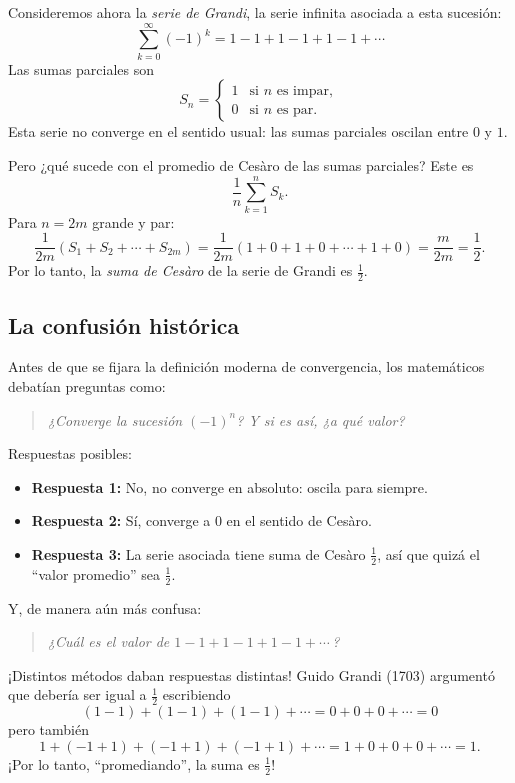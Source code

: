 Consideremos ahora la \emph{serie de Grandi}, la serie infinita asociada a esta sucesión:
\[
  \sum_{k=0}^{\infty} (-1)^k = 1 - 1 + 1 - 1 + 1 - 1 + \cdots
\]
Las sumas parciales son
\[
  S_n =
  \begin{cases}
    1 & \text{si } n \text{ es impar},\\
    0 & \text{si } n \text{ es par}.
  \end{cases}
\]
Esta serie no converge en el sentido usual: las sumas parciales oscilan entre $0$ y $1$.

Pero ¿qué sucede con el promedio de Cesàro de las sumas parciales? Este es
\[
  \frac1n \sum_{k=1}^{n} S_k .
\]
Para $n = 2m$ grande y par:
\[
  \frac{1}{2m}(S_1 + S_2 + \cdots + S_{2m}) = \frac{1}{2m}(1 + 0 + 1 + 0 + \cdots + 1 + 0) = \frac{m}{2m} = \frac12 .
\]
Por lo tanto, la \emph{suma de Cesàro} de la serie de Grandi es $\frac12$.

\subsection{La confusión histórica}

Antes de que se fijara la definición moderna de convergencia, los matemáticos debatían preguntas como:

\begin{quote}
\emph{¿Converge la sucesión $(-1)^n$? Y si es así, ¿a qué valor?}
\end{quote}

Respuestas posibles:
\begin{itemize}
  \item \textbf{Respuesta 1:} No, no converge en absoluto: oscila para siempre.
  \item \textbf{Respuesta 2:} Sí, converge a $0$ en el sentido de Cesàro.
  \item \textbf{Respuesta 3:} La serie asociada tiene suma de Cesàro $\frac12$, así que quizá el ``valor promedio'' sea $\frac12$.
\end{itemize}

Y, de manera aún más confusa:

\begin{quote}
\emph{¿Cuál es el valor de $1 - 1 + 1 - 1 + 1 - 1 + \cdots$\,?}
\end{quote}

¡Distintos métodos daban respuestas distintas! Guido Grandi (1703) argumentó que debería ser igual a $\frac12$ escribiendo
\[
  (1-1) + (1-1) + (1-1) + \cdots = 0 + 0 + 0 + \cdots = 0
\]
pero también
\[
  1 + (-1+1) + (-1+1) + (-1+1) + \cdots = 1 + 0 + 0 + 0 + \cdots = 1 .
\]
¡Por lo tanto, ``promediando'', la suma es $\frac12$!

